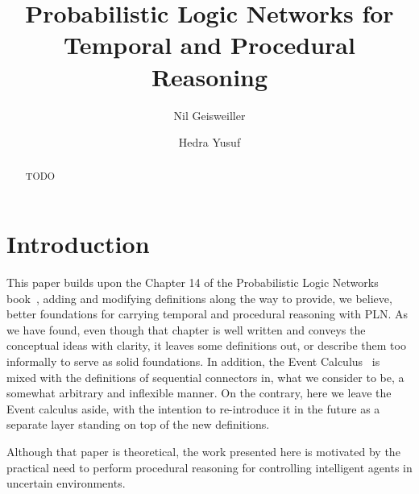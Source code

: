 \documentclass[runningheads]{llncs}
\begin{document}
%
\title{Probabilistic Logic Networks for Temporal and Procedural
  Reasoning}

%
\author{Nil Geisweiller
  \and Hedra Yusuf}
%
%
%
\maketitle              %
%

\begin{abstract}
  TODO

\end{abstract}

\section{Introduction}
\label{sec:intro}
This paper builds upon the Chapter 14 of the Probabilistic Logic
Networks book~\cite{Goertzel09PLN}, adding and modifying definitions
along the way to provide, we believe, better foundations for carrying
temporal and procedural reasoning with PLN.  As we have found, even
though that chapter is well written and conveys the conceptual ideas
with clarity, it leaves some definitions out, or describe them too
informally to serve as solid foundations.  In addition, the Event
Calculus~\cite{Shanahan2000} is mixed with the definitions of
sequential connectors in, what we consider to be, a somewhat arbitrary
and inflexible manner.  On the contrary, here we leave the Event
calculus aside, with the intention to re-introduce it in the future as
a separate layer standing on top of the new definitions.

Although that paper is theoretical, the work presented here is
motivated by the practical need to perform procedural reasoning for
controlling intelligent agents in uncertain environments.

\end{document}
